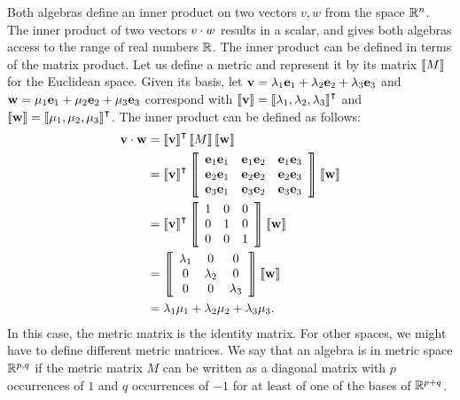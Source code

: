 Both algebras define an inner product on two vectors $v, w$ from the space $\mathbb{R}^n$.  The inner product of two vectors $v \mathbin{\cdot} w$ results in a scalar, and gives both algebras access to the range of real numbers $\mathbb{R}$.  The inner product can be defined in terms of the matrix product.  Let us define a metric and represent it by its matrix $\left\llbracket M \right\rrbracket$ for the Euclidean space.  Given its basis, let $\mathbf{v} = \lambda_1 \mathbf{e}_1 + \lambda_2 \mathbf{e}_2 + \lambda_3 \mathbf{e}_3$ and $\mathbf{w} = \mu_1 \mathbf{e}_1 + \mu_2 \mathbf{e}_2 + \mu_3 \mathbf{e}_3$ correspond with $\left\llbracket \mathbf{v} \right\rrbracket = \left\llbracket \lambda_1, \lambda_2, \lambda_3 \right\rrbracket^{\intercal}$ and $\left\llbracket \mathbf{w} \right\rrbracket = \left\llbracket \mu_1, \mu_2, \mu_3 \right\rrbracket^{\intercal}$.  The inner product can be defined as follows:
\begin{align*}
  \mathbf{v} \mathbin{\cdot} \mathbf{w} &= \left\llbracket \mathbf{v} \right\rrbracket^{\intercal} \left\llbracket M \right\rrbracket \left\llbracket \mathbf{w} \right\rrbracket \\
  &= \left\llbracket \mathbf{v} \right\rrbracket^{\intercal} \left\llbracket \begin{array}{ccc}
    \mathbf{e}_1\mathbf{e}_1 & \mathbf{e}_1\mathbf{e}_2 & \mathbf{e}_1\mathbf{e}_3 \\
    \mathbf{e}_2\mathbf{e}_1 & \mathbf{e}_2\mathbf{e}_2 & \mathbf{e}_2\mathbf{e}_3 \\
    \mathbf{e}_3\mathbf{e}_1 & \mathbf{e}_3\mathbf{e}_2 & \mathbf{e}_3\mathbf{e}_3
  \end{array} \right\rrbracket \left\llbracket \mathbf{w} \right\rrbracket \\
  &= \left\llbracket \mathbf{v} \right\rrbracket^{\intercal} \left\llbracket \begin{array}{ccc}
        1 & 0 & 0 \\
        0 & 1 & 0 \\
        0 & 0 & 1 
      \end{array} \right\rrbracket \left\llbracket \mathbf{w} \right\rrbracket \\
      &= \left\llbracket \begin{array}{ccc}
          \lambda_1 & 0 & 0 \\
          0 & \lambda_2 & 0 \\
          0 & 0 & \lambda_3 
        \end{array} \right\rrbracket \left\llbracket \mathbf{w} \right\rrbracket \\
        &= \lambda_1 \mu_1 + \lambda_2 \mu_2 + \lambda_3 \mu_3.
\end{align*}
In this case, the metric matrix is the identity matrix.  For other spaces, we might have to define different metric matrices.  We say that an algebra is in metric space $\mathbb{R}^{p,q}$ if the metric matrix $M$ can be written as a diagonal matrix with $p$ occurrences of $1$ and $q$ occurrences of $-1$ for at least of one of the bases of $\mathbb{R}^{p+q}$.

